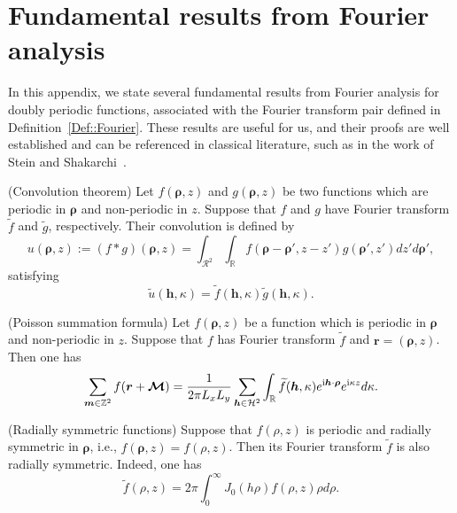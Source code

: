 \section{Fundamental results from Fourier analysis} \label{app::Fourier}
In this appendix, we state several fundamental results from Fourier analysis for doubly periodic functions, associated with the Fourier transform pair defined in Definition~\ref{Def::Fourier}. These results are useful for us, and their proofs are well established and can be referenced in classical literature, such as in the work of Stein and Shakarchi~\cite{stein2011fourier}.
\begin{lem}\label{lem::Convolution}
	(Convolution theorem) Let $f(\bm{\rho},z)$ and $g(\bm{\rho},z)$ be two functions which are periodic in $\bm{\rho}$ and non-periodic in $z$. Suppose that $f$ and $g$ have Fourier transform $\widetilde{f}$ and $\widetilde{g}$, respectively. Their convolution is defined by
	\begin{equation}\label{eq:Q2D_cov}
		u(\bm{\rho},z):=(f\ast g)(\bm{\rho},z)=\int_{\mathcal{R}^2}\int_{\mathbb{R}}f(\bm{\rho}-\bm{\rho}',z-z')g(\bm{\rho}',z')dz'd\bm{\rho}',
	\end{equation}
	satisfying
	\begin{equation}
		\widetilde{u}(\bm{h},\kappa)=\widetilde{f}(\bm{h},\kappa)\widetilde{g}(\bm{h},\kappa).
	\end{equation}
	
\end{lem}
\begin{lem}\label{lem::Poisson}
	(Poisson summation formula) Let $f(\bm{\rho},z)$ be a function which is periodic in $\bm{\rho}$ and non-periodic in $z$. Suppose that $f$ has Fourier transform $\widetilde{f}$ and $\bm{r}=(\bm{\rho},z)$. Then one has
	\begin{equation}
		\sum_{\bm{m}\in \mathbb{Z}^2} f(\bm{r} + \boldsymbol{\mathcal{M}}) = \frac{1}{2\pi L_x L_y}\sum_{\bm{h}\in \mathcal{H}^2}\int_{\mathbb{R}}\widetilde{f}(\bm{h},\kappa)e^{\mathrm{i} \bm{h}\cdot\bm{\rho}}e^{\mathrm{i} \kappa z}d\kappa.
	\end{equation}
\end{lem}
\begin{lem}\label{lem::2dfourier}
	(Radially symmetric functions) 
	Suppose that $f(\rho,z)$ is periodic and radially symmetric in $\bm{\rho}$, i.e., $f(\bm{\rho},z)=f(\rho,z)$. Then its Fourier transform $\widetilde{f}$ is also radially symmetric. Indeed, one has
	\begin{equation}
		\widetilde{f}(\rho,z)=2\pi\int_{0}^{\infty}J_0(h \rho)f(\rho,z)\rho d\rho.
	\end{equation}
\end{lem}

